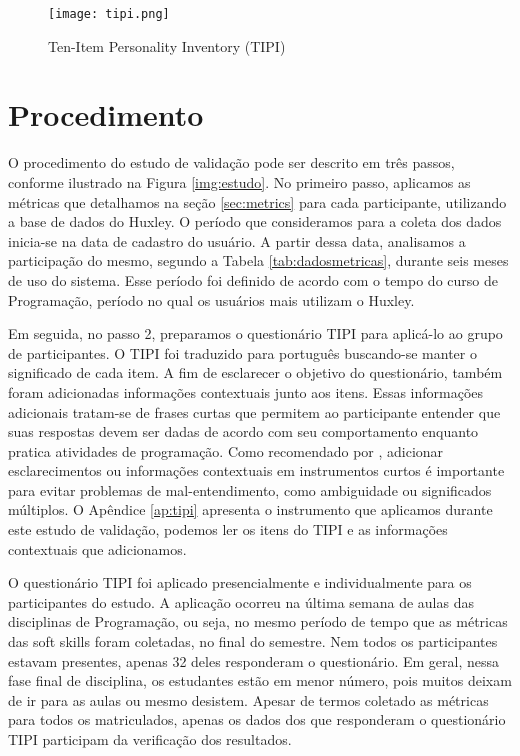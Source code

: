 \begin{figure}[h*]
\centering
\caption{\small Ten-Item Personality Inventory (TIPI)}
\texttt{[image: tipi.png]}
\label{fig:tipi}
\end{figure}

\section{Procedimento}
\label{sec:procedimento}

O procedimento do estudo de validação pode ser descrito em três passos, conforme ilustrado na Figura \ref{img:estudo}.
No primeiro passo, aplicamos as métricas que detalhamos na seção \ref{sec:metrics} para cada participante, utilizando a base de dados do Huxley. O período que consideramos para a coleta dos dados inicia-se na data de cadastro do usuário. A partir dessa data, analisamos a participação do mesmo, segundo a Tabela \ref{tab:dadosmetricas}, durante seis meses de uso do sistema. Esse período foi definido de acordo com o tempo do curso de Programação, período no qual os usuários mais utilizam o Huxley.%

Em seguida, no passo 2, preparamos o questionário TIPI para aplicá-lo ao grupo de participantes. O TIPI foi traduzido para português buscando-se manter o significado de cada item. A fim de esclarecer o objetivo do questionário, também foram adicionadas informações contextuais junto aos itens. Essas informações adicionais tratam-se de frases curtas que permitem ao participante entender que suas respostas devem ser dadas de acordo com seu comportamento enquanto pratica atividades de programação. Como recomendado por \cite{john:99}, adicionar esclarecimentos ou informações contextuais em instrumentos curtos é importante para evitar problemas de mal-entendimento, como ambiguidade ou significados múltiplos.
O Apêndice \ref{ap:tipi} apresenta o instrumento que aplicamos durante este estudo de validação, podemos ler os itens do TIPI e as informações contextuais que adicionamos.

O questionário TIPI foi aplicado presencialmente e individualmente para os participantes do estudo. A aplicação ocorreu na última semana de aulas das disciplinas de Programação, ou seja, no mesmo período de tempo que as métricas das soft skills foram coletadas, no final do semestre. Nem todos os participantes estavam presentes, apenas 32 deles responderam o questionário. Em geral, nessa fase final de disciplina, os estudantes estão em menor número, pois muitos deixam de ir para as aulas ou mesmo desistem. Apesar de termos coletado as métricas para todos os matriculados, apenas os dados dos que responderam o questionário TIPI participam da verificação dos resultados.

